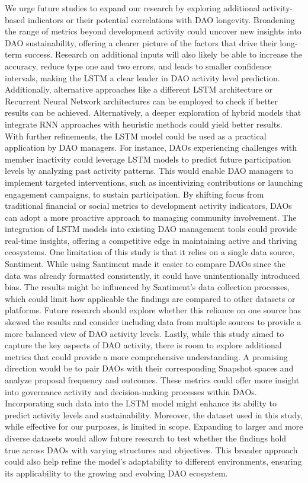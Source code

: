 We urge future studies to expand our research by exploring additional activity-based indicators or their potential correlations with DAO longevity.
Broadening the range of metrics beyond development activity could uncover new insights into DAO sustainability, offering a clearer picture of the factors that drive their long-term success.
Research on additional inputs will also likely be able to increase the accuracy, reduce type one and two errors, and leads to smaller confidence intervals, making the LSTM a clear leader in DAO activity level prediction.
Additionally, alternative approaches like a different LSTM architecture or Recurrent Neural Network architectures can be employed to check if better results can be achieved.
Alternatively, a deeper exploration of hybrid models that integrate RNN approaches with heuristic methods could yield better results.
With further refinements, the LSTM model could be used as a practical application by DAO managers. For instance, DAOs experiencing challenges with member inactivity could leverage LSTM models to predict future participation levels by analyzing past activity patterns. This would enable DAO managers to implement targeted interventions, such as incentivizing contributions or launching engagement campaigns, to sustain participation. By shifting focus from traditional financial or social metrics to development activity indicators, DAOs can adopt a more proactive approach to managing community involvement. The integration of LSTM models into existing DAO management tools could provide real-time insights, offering a competitive edge in maintaining active and thriving ecosystems.
One limitation of this study is that it relies on a single data source, Santiment. While using Santiment made it easier to compare DAOs since the data was already formatted consistently, it could have unintentionally introduced bias. The results might be influenced by Santiment's data collection processes, which could limit how applicable the findings are compared to other datasets or platforms. Future research should explore whether this reliance on one source has skewed the results and consider including data from multiple sources to provide a more balanced view of DAO activity levels.
Lastly, while this study aimed to capture the key aspects of DAO activity, there is room to explore additional metrics that could provide a more comprehensive understanding.
A promising direction would be to pair DAOs with their corresponding Snapshot spaces and analyze proposal frequency and outcomes.
These metrics could offer more insight into governance activity and decision-making processes within DAOs.
Incorporating such data into the LSTM model might enhance its ability to predict activity levels and sustainability.
Moreover, the dataset used in this study, while effective for our purposes, is limited in scope. Expanding to larger and more diverse datasets would allow future research to test whether the findings hold true across DAOs with varying structures and objectives. This broader approach could also help refine the model’s adaptability to different environments, ensuring its applicability to the growing and evolving DAO ecosystem.


